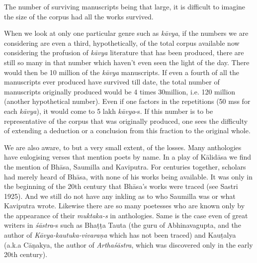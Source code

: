 The number of surviving manuscripts being that large, it is difficult to imagine the size of the corpus had all the works survived. 

When we look at only one particular genre such as {\sl kāvya}, if the numbers we are considering are even a third, hypothetically, of the total corpus available now considering the profusion of {\sl kāvya} literature that has been produced, there are still so many in that number which haven’t even seen the light of the day. There would then be 10 million of the {\sl kāvya} manuscripts. If even a fourth of all the manuscripts ever produced have survived till date, the total number of manuscripts originally produced would be 4 times 30million, i.e. 120 million (another hypothetical number). Even if one factors in the repetitions (50 mss for each {\sl kāvya}), it would come to 5 lakh {\sl kāvya}-s. If this number is to be representative of the corpus that was originally produced, one sees the difficulty of extending a deduction or a conclusion from this fraction to the original whole.

We are also aware, to but a very small extent, of the losses. Many anthologies have eulogising verses that mention poets by name. In a play of Kālidāsa we find the mention of Bhāsa, Saumilla and Kaviputra. For centuries together, scholars had merely heard of Bhāsa, with none of his works being available. It was only in the beginning of the 20th century that Bhāsa’s works were traced (see Sastri 1925). And we still do not have any inkling as to who Saumilla was or what Kaviputra wrote. Likewise there are so many poetesses who are known only by the appearance of their \hbox{{\sl muktaka-s}} in anthologies. Same is the case even of great writers in {\sl śāstra}-s such as Bhaṭṭa Tauta (the guru of Abhinavagupta, and the author of {\sl Kāvya-kautuka-vivaraṇa} which has not been traced) and Kauṭalya (a.k.a Cāṇakya, the author of {\sl Arthaśāstra}, which was discovered only in the early 20th century). 

